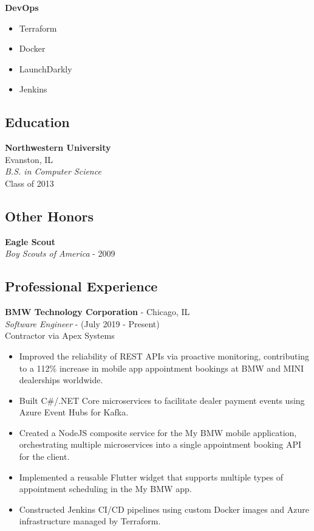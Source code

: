 \documentclass[11pt]{article}
\begin{document}
\begin{paracol}{2}
\noindent \textbf{DevOps}
\begin{itemize}
    \item Terraform
    \item Docker
    \item LaunchDarkly
    \item Jenkins
\end{itemize}

\subsection*{Education}
\textbf{Northwestern University} \\ 
Evanston, IL \\
\textit{B.S. in Computer Science}  \\
{\footnotesize{Class of 2013}}

\subsection*{Other Honors}
\textbf{Eagle Scout} \\
\textit{Boy Scouts of America} - {\footnotesize{2009}}

\switchcolumn 

\subsection*{Professional Experience} 

\textbf{BMW Technology Corporation} - Chicago, IL \\
\textit{Software Engineer} - {\footnotesize{(July 2019 - Present)}} \\
{\footnotesize{Contractor via Apex Systems}} 
\begin{itemize}
    \item Improved the reliability of REST APIs via proactive monitoring, contributing to a 112\% increase in mobile app appointment bookings at BMW and MINI dealerships worldwide.
    \item Built C\#/.NET Core microservices to facilitate dealer payment events using Azure Event Hubs for Kafka.
    \item Created a NodeJS composite service for the My BMW mobile application, orchestrating multiple microservices into a single appointment booking API for the client.
    \item Implemented a reusable Flutter widget that supports multiple types of appointment scheduling in the My BMW app.
    \item Constructed Jenkins CI/CD pipelines using custom Docker images and Azure infrastructure managed by Terraform.
\end{itemize} 



\end{paracol}
\end{document}
